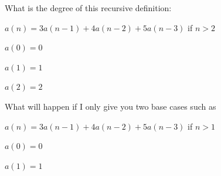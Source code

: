 What is the degree of this recursive definition:



$a(n) = 3a(n-1) + 4a(n-2) + 5a(n-3)$ if $n > 2$



$a(0) = 0$



$a(1) = 1$



$a(2) = 2$



What will happen if I only give you two base cases such as



$a(n) = 3a(n-1) + 4a(n-2) + 5a(n-3)$ if $n > 1$



$a(0) = 0$



$a(1) = 1$

